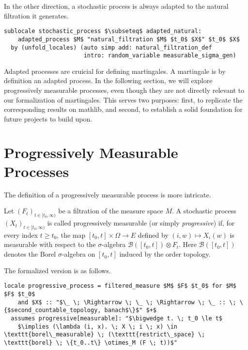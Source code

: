 In the other direction, a stochastic process is always adapted to the natural filtration it generates.

\begin{isalemma}
{\small
\begin{lstlisting}[style=isabelle]
sublocale stochastic_process $\subseteq$ adapted_natural: 
	adapted_process $M$ "natural_filtration $M$ $t_0$ $X$" $t_0$ $X$ 
  by (unfold_locales) (auto simp add: natural_filtration_def 
  					   intro: random_variable measurable_sigma_gen) 
\end{lstlisting}
}
\end{isalemma}

Adapted processes are cruicial for defining martingales. A martingale is by definition an adapted process. In the following section, we will explore progressively measurable processes, even though they are not directly relevant to our formalization of martingales. This serves two purposes: first, to replicate the corresponding results on \textsf{mathlib}, and second, to establish a solid foundation for future projects to build upon.

\section{Progressively Measurable Processes}

The definition of a progressively measurable process is more intricate.

\begin{definition}
	Let $(F_t)_{t \in [t_0, \infty)}$ be a filtration of the measure space $M$. A stochastic process $(X_t)_{t \in [t_0, \infty)}$ is called progressively measurable (or simply \textit{progressive}) if, for every index $t \ge t_0$, the map $[t_0, t] \times \Omega \rightarrow E$ defined by $(i, w) \mapsto X_i(w)$ is measurable with respect to the $\sigma$-algebra $\mathcal{B}([t_0, t]) \otimes F_t$. Here $\mathcal{B}([t_0, t])$ denotes the Borel $\sigma$-algebra on $[t_0, t]$ induced by the order topology.
\end{definition}

The formalized version is as follows.

\begin{isadefinition}
{\small
\begin{lstlisting}[style=isabelle]
locale progressive_process = filtered_measure $M$ $F$ $t_0$ for $M$ $F$ $t_0$
	and $X$ :: "$\_ \; \Rightarrow \; \_ \; \Rightarrow \; \_ :: \; \{$second_countable_topology, banach$\}$" $+$
  assumes progressive[measurable]: "$\bigwedge t. \; t_0 \le t$
	$\implies (\lambda (i, x). \; X \; i \; x) \in \texttt{borel\_measurable} \; (\texttt{restrict\_space} \; \texttt{borel} \; \{t_0..t\} \otimes_M (F \; t))$"
\end{lstlisting}
}
\end{isadefinition}

